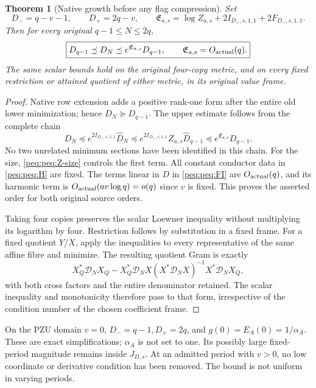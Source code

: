 \documentclass[11pt,a4paper]{article}
\newtheorem{theorem}{Theorem}[section]
\begin{document}
\begin{theorem}[Native growth before any flag compression]
Set
\begin{equation}
 D_-=q-v-1,\qquad D_+=2q-v,\qquad
 \boxed{\mathfrak E_{a,s}
 =\log Z_{a,s}+2I_{D_+,s,1,1}+2F_{D_-,s,1,1}.}
 \label{peq:peq:E}
\end{equation}
Then for every original $q-1\le N\le2q$,
\begin{equation}
 \boxed{D_{q-1}\preceq D_N\preceq
 e^{\mathfrak E_{a,s}}D_{q-1},\qquad
 \mathfrak E_{a,s}=O_{\rm actual}(q).}
 \label{peq:peq:native-bound}
\end{equation}
The same scalar bounds hold on the original four-copy metric, and on every fixed restriction or attained quotient of either metric, in its original value frame.
\end{theorem}
\begin{proof}
Native row extension adds a positive rank-one form after the entire old lower minimization; hence $D_N\succeq D_{q-1}$. The upper estimate follows from the complete chain
\[
 D_N\preceq e^{2I_{D_+,s,1,1}}\widehat D_N
 \preceq e^{2I_{D_+,s,1,1}}Z_{a,s}\widehat D_{q-1}
 \preceq e^{\mathfrak E_{a,s}}D_{q-1}.
\]
No two unrelated minimum sections have been identified in this chain.
For the size, \eqref{peq:peq:Z-size} controls the first term. All constant conductor data in \eqref{peq:peq:H} are fixed. The terms linear in $D$ in \eqref{peq:peq:FI} are $O_{\rm actual}(q)$, and its harmonic term is $O_{\rm actual}(av\log q)=o(q)$ since $v$ is fixed. This proves the asserted order for both original source orders.

Taking four copies preserves the scalar Loewner inequality without multiplying its logarithm by four. Restriction follows by substitution in a fixed frame. For a fixed quotient $Y/X$, apply the inequalities to every representative of the same affine fibre and minimize. The resulting quotient Gram is exactly
\[
 X_Q^*\mathcal D_NX_Q-X_Q^*\mathcal D_NX
            (X^*\mathcal D_NX)^{-1}X^*\mathcal D_NX_Q,
\]
with both cross factors and the entire denominator retained. The scalar inequality and monotonicity therefore pass to that form, irrespective of the condition number of the chosen coefficient frame.
\end{proof}

On the PZU domain $v=0$, $D_-=q-1,D_+=2q$, and $g(0)=E_A(0)=1/\alpha_A$. These are exact simplifications; $\alpha_A$ is not set to one. Its possibly large fixed-period magnitude remains inside $J_{D,s}$. At an admitted period with $v>0$, no low coordinate or derivative condition has been removed. The bound is not uniform in varying periods.
\end{document}
